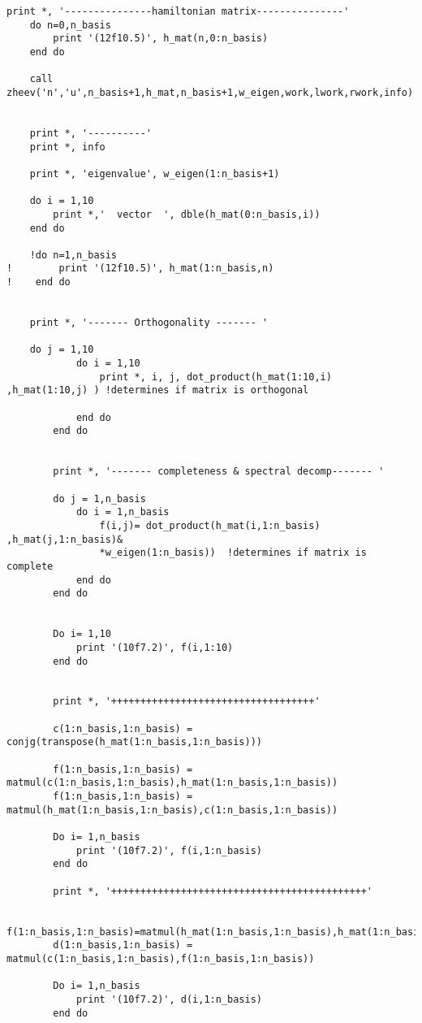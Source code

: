 \documentclass[12pt]{article}
\begin{document}
\begin{lstlisting}[frame=single,caption={ {\tt mtestthisone.f95}},label=module]
    print *, '---------------hamiltonian matrix---------------'
    do n=0,n_basis
        print '(12f10.5)', h_mat(n,0:n_basis)
    end do

    call zheev('n','u',n_basis+1,h_mat,n_basis+1,w_eigen,work,lwork,rwork,info)


    print *, '----------'
    print *, info

    print *, 'eigenvalue', w_eigen(1:n_basis+1)
    
    do i = 1,10
		print *,'  vector  ', dble(h_mat(0:n_basis,i)) 
	end do
	
	!do n=1,n_basis
!        print '(12f10.5)', h_mat(1:n_basis,n)
!    end do
    
    
    print *, '------- Orthogonality ------- '
    
 	do j = 1,10
            do i = 1,10
                print *, i, j, dot_product(h_mat(1:10,i) ,h_mat(1:10,j) ) !determines if matrix is orthogonal
            
            end do
        end do

        
        print *, '------- completeness & spectral decomp------- '
        
        do j = 1,n_basis
            do i = 1,n_basis
                f(i,j)= dot_product(h_mat(i,1:n_basis) ,h_mat(j,1:n_basis)&
                *w_eigen(1:n_basis))  !determines if matrix is complete
            end do
        end do 
        
 
        Do i= 1,10
            print '(10f7.2)', f(i,1:10)
        end do 
        
        
        print *, '+++++++++++++++++++++++++++++++++++'
        
        c(1:n_basis,1:n_basis) = conjg(transpose(h_mat(1:n_basis,1:n_basis)))
        
        f(1:n_basis,1:n_basis) = matmul(c(1:n_basis,1:n_basis),h_mat(1:n_basis,1:n_basis))
        f(1:n_basis,1:n_basis) = matmul(h_mat(1:n_basis,1:n_basis),c(1:n_basis,1:n_basis))
        
        Do i= 1,n_basis
            print '(10f7.2)', f(i,1:n_basis)
        end do 
        
        print *, '++++++++++++++++++++++++++++++++++++++++++++'
        
        f(1:n_basis,1:n_basis)=matmul(h_mat(1:n_basis,1:n_basis),h_mat(1:n_basis,1:n_basis))
        d(1:n_basis,1:n_basis) = matmul(c(1:n_basis,1:n_basis),f(1:n_basis,1:n_basis))
        
        Do i= 1,n_basis
            print '(10f7.2)', d(i,1:n_basis)
        end do 
        

\end{lstlisting}
\end{document}
